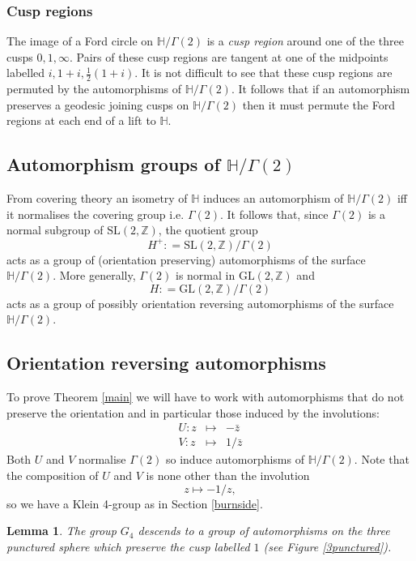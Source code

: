 \documentclass[12pt,a4paper]{amsart}
\newtheorem{lem}[thm]{Lemma}
\def\HH{\mathbb{H}}
\def\KK{G_4}
\def\xx{\HH/g2}
\def\ZZ{\mathbb{Z}}
\def\gl2{\mathrm{GL}(2, \ZZ)}
\def\sl2{\mathrm{SL}(2, \ZZ)}
\def\g2{\Gamma(2)}
\def\xx{\HH/\g2}
\begin{document}
\subsubsection{Cusp regions}

The image of a Ford circle on $\xx$ is a \textit{cusp region}
around one of the three cusps $0,1,\infty$.
Pairs of these cusp regions are tangent at one of the midpoints
labelled $i, 1+i, \frac12(1+i)$.
It is not difficult to see that these cusp regions 
are permuted by the automorphisms of $\xx$.
It follows that if an automorphism preserves a geodesic  joining cusps on $\xx$
then it must permute the Ford regions at each end of a lift to $\HH$.


\subsection{Automorphism groups of $\xx$}
From covering theory an isometry  of $\HH$ 
induces an automorphism of $\xx$ iff it normalises the covering group
i.e. $\g2$.
It follows that,
since $\g2$ is a normal subgroup of $\sl2$,
 the quotient group
$$H^+: = \sl2/\g2$$
acts as a group of (orientation preserving) automorphisms of the surface $\xx$.
More generally, $\g2$ is normal in $\gl2$ and 
$$H: = \gl2/\g2$$
acts as a group of possibly orientation reversing  automorphisms of the surface $\xx$.


\subsection{Orientation reversing automorphisms}
To prove Theorem \ref{main} we will have to work with automorphisms
that do not preserve the orientation and in particular 
those induced by the involutions:
\begin{eqnarray*}
U: z &\mapsto& -\bar{z} \\
V: z &\mapsto& 1/\bar{z} 
\end{eqnarray*}
Both $U$ and $V$ normalise $\g2$ so induce automorphisms of $\xx$. Note
that
the composition of $U$ and $V$ is none other than the involution
$$ z \mapsto -1/z,$$
so we have a Klein 4-group as in Section \ref{burnside}.


\begin{lem}
The group $\KK$ descends to a group of automorphisms 
on the three punctured sphere which preserve the cusp labelled $1$ (see Figure \ref{3punctured}).
\end{lem}

\proof
\end{document}
